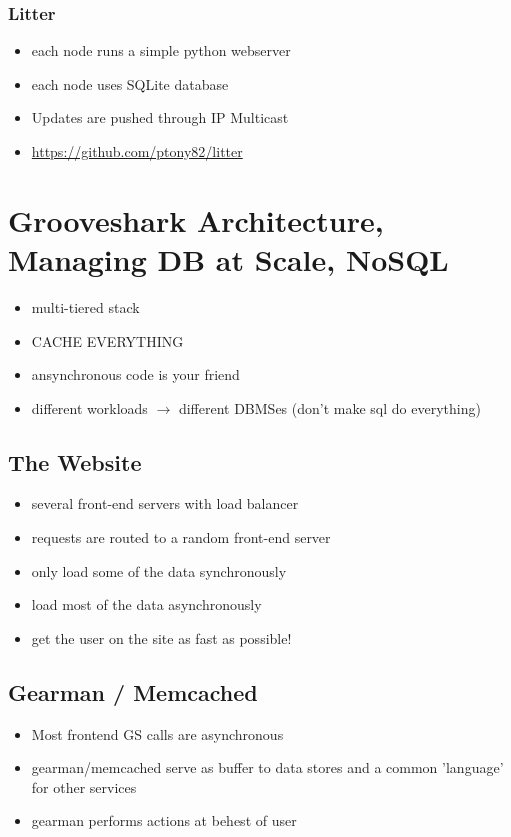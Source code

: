 \documentclass[12pt]{article}
\begin{document}
\subsubsection{Litter}
\begin{itemize}
  \item each node runs a simple python webserver
  \item each node uses SQLite database
  \item Updates are pushed through IP Multicast
  \item \url{https://github.com/ptony82/litter}
\end{itemize}

\section{Grooveshark Architecture, Managing DB at Scale, NoSQL}
\begin{itemize}
  \item multi-tiered stack
  \item CACHE EVERYTHING
  \item ansynchronous code is your friend
  \item different workloads $\rightarrow$ different DBMSes (don't make sql do
    everything)
\end{itemize}
\subsection{The Website}
\begin{itemize}
  \item several front-end servers with load balancer
  \item requests are routed to a random front-end server
  \item only load some of the data synchronously
  \item load most of the data asynchronously
  \item get the user on the site as fast as possible!
\end{itemize}
\subsection{Gearman / Memcached}
\begin{itemize}
  \item Most frontend GS calls are asynchronous
  \item gearman/memcached serve as buffer to data stores and a common
    'language' for other services
  \item gearman performs actions at behest of user
\end{itemize}
\end{document}
